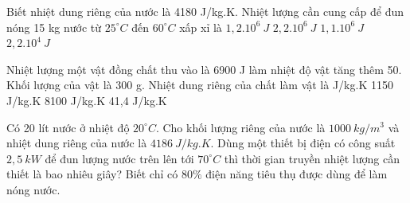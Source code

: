 \begin{vidu}
	Biết nhiệt dung riêng của nước là 4180 J/kg.K. Nhiệt lượng cần cung cấp để đun nóng 15 kg nước từ $25^\circ C$ đến $60^\circ C$ xấp xỉ là
	\choice
	{$1,2.10^6\ J$}
	{\True $2,2.10^6\ J$}
	{$1,1.10^6\ J$}
	{$2,2.10^4\ J$}
	\end{vidu}

\begin{vidu}%
	Nhiệt lượng một vật đồng chất thu vào là 6900 J làm nhiệt độ vật tăng thêm 50\doC. Khối lượng của vật là 300 g. Nhiệt dung riêng của chất làm vật là
	\choice
	{ J/kg.K}
	{1150 J/kg.K}
	{8100 J/kg.K}
	{41,4 J/kg.K}
	\end{vidu}

\begin{vidu}
	Có 20 lít nước ở nhiệt độ $20^\circ C$. Cho khối lượng riêng của nước là $1000\ kg / m^3$ và nhiệt dung riêng của nước là $4186\ J/kg.K$. Dùng một thiết bị điện có công suất $2,5\ kW$ để đun lượng nước trên lên tới $70^\circ C$ thì thời gian truyền nhiệt lượng cần thiết là bao nhiêu giây? Biết chỉ có $80 \%$ điện năng tiêu thụ được dùng để làm nóng nước.
	\end{vidu}

